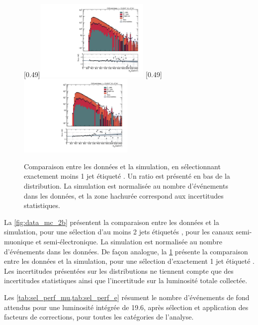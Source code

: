  \begin{figure}[p!] \centering
    [0.49\textwidth]{\includegraphics[width=0.49\textwidth,angle=-90,origin=c]{chapitre7/figs/data_mc/1btag/semimu/hmttSelected_btag_sel.pdf}} \hfill
    [0.49\textwidth]{\includegraphics[width=0.49\textwidth,angle=-90,origin=c]{chapitre7/figs/data_mc/1btag/semie/hmttSelected_btag_sel.pdf}}
    \caption{Comparaison entre les données et la simulation, en sélectionnant exactement moins 1 jet étiqueté \Pbottom{}. Un ratio est présenté en bas de la distribution. La simulation est normalisée au nombre d'événements dans les données, et la zone hachurée correspond aux incertitudes statistiques.}
    \label{fig:data_mc_1b}
\end{figure}

La \cref{fig:data_mc_2b} présentent la comparaison entre les données et la simulation, pour une sélection d'au moins 2 jets étiquetés \Pbottom, pour les canaux semi-muonique et semi-électronique. La simulation est normalisée au nombre d'événements dans les données. De façon analogue, la \cref{fig:data_mc_1b} présente la comparaison entre les données et la simulation, pour une sélection d'exactement 1 jet étiqueté \Pbottom. Les incertitudes présentées sur les distributions ne tiennent compte que des incertitudes statistiques ainsi que l'incertitude sur la luminosité totale collectée.

\medskip

Les \cref{tab:sel_perf_mu,tab:sel_perf_e} résument le nombre d'événements de fond attendus pour une luminosité intégrée de \SI{19.6}{\invfb}, après sélection et application des facteurs de corrections, pour toutes les catégories de l'analyse.

